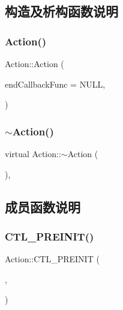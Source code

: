 \subsection{构造及析构函数说明}
\mbox{\label{class_action_a656f4ac0205bbd055dd360248786475a}} 
\subsubsection{\texorpdfstring{Action()}{Action()}}
{\footnotesize\ttfamily Action\+::\+Action (\begin{DoxyParamCaption}\item[{void($\ast$)()}]{end\+Callback\+Func = {\ttfamily NULL},  }\item[{C\+T\+L\+\_\+\+D\+E\+F\+P\+A\+R\+AM}]{ }\end{DoxyParamCaption})\hspace{0.3cm}{\ttfamily [inline]}}

\mbox{\label{class_action_abcf4c6358f53a666631ace11b325a7cd}} 
\subsubsection{\texorpdfstring{$\sim$\+Action()}{~Action()}}
{\footnotesize\ttfamily virtual Action\+::$\sim$\+Action (\begin{DoxyParamCaption}{ }\end{DoxyParamCaption})\hspace{0.3cm}{\ttfamily [inline]}, {\ttfamily [virtual]}}



\subsection{成员函数说明}
\mbox{\label{class_action_a4d1309da871dfc1da7b4bdc896e34c0e}} 
\subsubsection{\texorpdfstring{C\+T\+L\+\_\+\+P\+R\+E\+I\+N\+I\+T()}{CTL\_PREINIT()}}
{\footnotesize\ttfamily Action\+::\+C\+T\+L\+\_\+\+P\+R\+E\+I\+N\+IT (\begin{DoxyParamCaption}\item[{\hyperlink{class_action}{Action}}]{,  }\item[{ege\+Control\+Base}]{ }\end{DoxyParamCaption})\hspace{0.3cm}{\ttfamily [inline]}}



